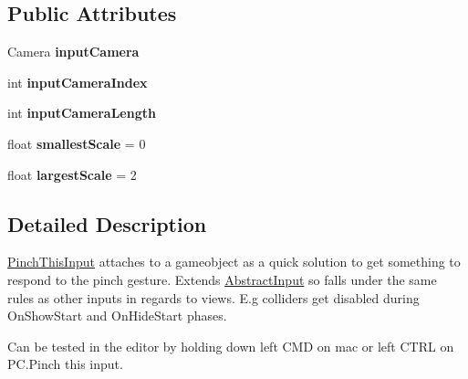 \subsection*{Public Attributes}
\begin{DoxyCompactItemize}
\item 
\hypertarget{class_scaffolding_1_1_pinch_this_input_a4ecf8031d0563624942fea3713354054}{Camera {\bfseries input\-Camera}}\label{class_scaffolding_1_1_pinch_this_input_a4ecf8031d0563624942fea3713354054}

\item 
\hypertarget{class_scaffolding_1_1_pinch_this_input_a52967dabb3c854e6aeb501f3423feb0d}{int {\bfseries input\-Camera\-Index}}\label{class_scaffolding_1_1_pinch_this_input_a52967dabb3c854e6aeb501f3423feb0d}

\item 
\hypertarget{class_scaffolding_1_1_pinch_this_input_a8c0727e05a84d7ee4e9136b728302f77}{int {\bfseries input\-Camera\-Length}}\label{class_scaffolding_1_1_pinch_this_input_a8c0727e05a84d7ee4e9136b728302f77}

\item 
\hypertarget{class_scaffolding_1_1_pinch_this_input_acb30c6b37a2031dccf9951608e247136}{float {\bfseries smallest\-Scale} = 0}\label{class_scaffolding_1_1_pinch_this_input_acb30c6b37a2031dccf9951608e247136}

\item 
\hypertarget{class_scaffolding_1_1_pinch_this_input_af682306ce14b0aea6fae51486784857e}{float {\bfseries largest\-Scale} = 2}\label{class_scaffolding_1_1_pinch_this_input_af682306ce14b0aea6fae51486784857e}

\end{DoxyCompactItemize}


\subsection{Detailed Description}
\hyperlink{class_scaffolding_1_1_pinch_this_input}{Pinch\-This\-Input} attaches to a gameobject as a quick solution to get something to respond to the pinch gesture. Extends \hyperlink{class_scaffolding_1_1_abstract_input}{Abstract\-Input} so falls under the same rules as other inputs in regards to views. E.\-g colliders get disabled during On\-Show\-Start and On\-Hide\-Start phases. 

Can be tested in the editor by holding down left C\-M\-D on mac or left C\-T\-R\-L on P\-C.\-Pinch this input. 

